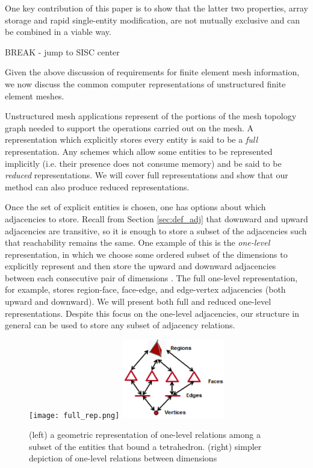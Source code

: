 One key contribution of this paper is to show that the latter two properties,
array storage and rapid single-entity modification, are not mutually exclusive
and can be combined in a viable way.

{\color{red} BREAK - jump to SISC center}

Given the above discussion of requirements
for finite element mesh information, we now discuss
the common computer representations of unstructured
finite element meshes.

Unstructured mesh applications represent
of the portions of the mesh topology graph
needed to support the operations carried out on the mesh.
A representation which explicitly stores
every entity is said to be a {\it full}
representation.
Any schemes which allow some entities to be represented
implicitly (i.e. their presence does not consume memory)
and be said to be {\it reduced} representations.
We will cover full representations and show that our method
can also produce reduced representations.

Once the set of explicit entities is chosen, one has
options about which adjacencies to store.
Recall from Section \ref{sec:def_adj} that downward and upward
adjacencies are transitive, so it is enough to
store a subset of the adjacencies such that reachability
remains the same.
One example of this is the {\it one-level} representation,
in which we choose some ordered subset of the dimensions
to explicitly represent and then store the upward
and downward adjacencies between each consecutive
pair of dimensions \cite{beall1997general}.
The full one-level representation, for example, stores
region-face, face-edge, and edge-vertex adjacencies
(both upward and downward).
We will present both full and reduced one-level representations.
Despite this focus on the one-level adjacencies, our structure
in general can be used to store any subset of
adjacency relations.

\begin{figure}
\begin{center}
\texttt{[image: full\_rep.png]}
\includegraphics[width=0.4\textwidth]{one_level.png}
\caption{(left) a geometric representation of one-level
relations among a subset of the entities that bound a tetrahedron.
(right) simpler depiction of one-level relations between dimensions}
\label{fig:topo}
\end{center}
\end{figure}

